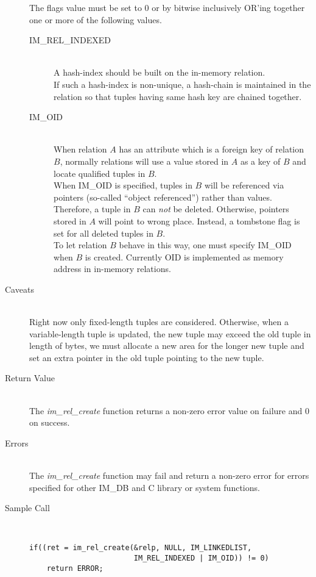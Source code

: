 \documentclass[11pt]{article}
\def\cdf{\sf }
\def\cdf{\sf }
\newcommand{\IMDB}{{\small{\cdf IM\_DB}}}
\begin{document}
\begin{description}
  The flags value must be set to 0 or by bitwise inclusively OR'ing
  together one or more of the following values. 
  \begin{description}
  \item[IM\_REL\_INDEXED]\ \\
       A hash-index should be built on the in-memory relation.\\
       If such a hash-index is non-unique, a hash-chain is maintained
       in the relation so that tuples having same hash key are chained
       together.
  \item[IM\_OID]\ \\
       When relation $A$ has an attribute which is a foreign key of
       relation $B$, normally relations will use a value stored in $A$
       as a key of $B$ and locate qualified tuples in $B$.\\
       When IM\_OID is specified, tuples in $B$ will be referenced via
       pointers (so-called ``object referenced'') rather than values.
       Therefore, a tuple in $B$ can {\em not} be deleted. Otherwise,
       pointers stored in $A$ will point to wrong place.  Instead, a
       tombstone flag is set for all deleted tuples in $B$.\\
       To let relation $B$ behave in this way, one must specify
       IM\_OID when $B$ is created.  Currently OID is implemented as
       memory address in in-memory relations.
  \end{description}
\item[Caveats]\ \\
  Right now only fixed-length tuples are considered.  Otherwise, when
  a variable-length tuple is updated, the new tuple may exceed the
  old tuple in length of bytes, we must allocate a new area for the
  longer new tuple and set an extra pointer in the old tuple pointing
  to the new tuple.
\item[Return Value]\ \\
  The {\em im\_rel\_create} function returns a non-zero error value on
  failure and 0 on success.
\item[Errors]\ \\
  The {\em im\_rel\_create} function may fail and return a non-zero
  error for errors specified for other {\IMDB} and C library or system
  functions.
\item[Sample Call]\ 
\begin{verbatim}
if((ret = im_rel_create(&relp, NULL, IM_LINKEDLIST,
                        IM_REL_INDEXED | IM_OID)) != 0)
    return ERROR;
\end{verbatim}
\end{description}
\end{document}
